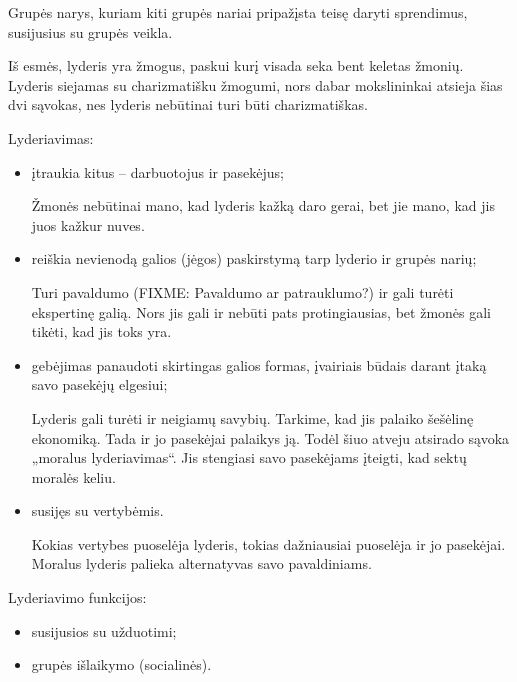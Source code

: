 \begin{defn}[Lyderis]
  Grupės narys, kuriam kiti grupės nariai pripažįsta teisę daryti
  sprendimus, susijusius su grupės veikla.
\end{defn}

Iš esmės, lyderis yra žmogus, paskui kurį visada seka bent keletas žmonių.
Lyderis siejamas su charizmatišku žmogumi, nors dabar mokslininkai
atsieja šias dvi sąvokas, nes lyderis nebūtinai turi būti charizmatiškas.

Lyderiavimas:
\begin{itemize}
  \item įtraukia kitus – darbuotojus ir pasekėjus;
    \begin{note}
      Žmonės nebūtinai mano, kad lyderis kažką daro gerai, bet jie mano,
      kad jis juos kažkur nuves.
    \end{note}
  \item reiškia nevienodą galios (jėgos) paskirstymą tarp lyderio ir
    grupės narių;
    \begin{note}
      Turi pavaldumo (FIXME: Pavaldumo ar patrauklumo?) ir gali turėti
      ekspertinę galią. Nors jis gali ir nebūti pats protingiausias,
      bet žmonės gali tikėti, kad jis toks yra.
    \end{note}
  \item gebėjimas panaudoti skirtingas galios formas, įvairiais būdais
    darant įtaką savo pasekėjų elgesiui;
    \begin{note}
      Lyderis gali turėti ir neigiamų savybių. Tarkime, kad jis palaiko
      šešėlinę ekonomiką. Tada ir jo pasekėjai palaikys ją. Todėl šiuo
      atveju atsirado sąvoka „moralus lyderiavimas“. Jis stengiasi
      savo pasekėjams įteigti, kad sektų moralės keliu.
    \end{note}
  \item susijęs su vertybėmis.
    \begin{note}
      Kokias vertybes puoselėja lyderis, tokias dažniausiai puoselėja
      ir jo pasekėjai. Moralus lyderis palieka alternatyvas savo
      pavaldiniams.
    \end{note}
\end{itemize}

Lyderiavimo funkcijos:
\begin{itemize}
  \item susijusios su užduotimi;
  \item grupės išlaikymo (socialinės).
\end{itemize}

